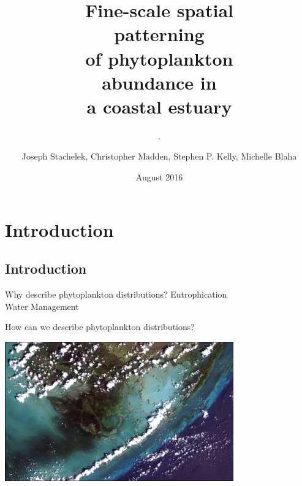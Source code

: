 \documentclass[compress,noflama,nosectionpages]{beamer}
\title{\nohyphens{Fine-scale spatial \protect\\ patterning \protect\\ of phytoplankton \protect\\ abundance in \protect\\ a coastal estuary}}
\subtitle{\nohyphens{.}}
\date{August 2016}
\author{{\Medium Joseph Stachelek}, Christopher Madden, Stephen P. Kelly, Michelle Blaha}
\institute{South Florida Water Management District\\ {\Medium Everglades Division}}
\begin{document}

\maketitle



\section{Introduction}
\subsection{Introduction}

\begin{frame}{Why describe phytoplankton distributions?}
	Eutrophication \\
	Water Management \\
\end{frame}

\begin{frame}{How can we describe phytoplankton distributions?}

	\begin{centering}
		\includegraphics[height=6cm,keepaspectratio=true]{images/landsat_border.jpg}\\
	\end{centering}

\end{frame}
\end{document}
